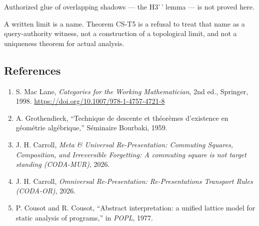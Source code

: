 \documentclass[
  11pt,
]{article}
\providecommand{\tightlist}{%
  \setlength{\itemsep}{0pt}\setlength{\parskip}{0pt}}
\begin{document}
Authorized glue of overlapping shadows --- the H3'\,' lemma --- is not proved here.

A written limit is a name. Theorem CS-T5 is a refusal to treat that name as a query-authority witness, not a construction of a topological limit, and not a uniqueness theorem for actual analysis.

\subsection{References}\label{references}

\begin{enumerate}
\def\labelenumi{\arabic{enumi}.}
\tightlist
\item
  S. Mac Lane, \emph{Categories for the Working Mathematician}, 2nd ed., Springer, 1998. \url{https://doi.org/10.1007/978-1-4757-4721-8}
\item
  A. Grothendieck, ``Technique de descente et théorèmes d'existence en géométrie algébrique,'' Séminaire Bourbaki, 1959.
\item
  J. H. Carroll, \emph{Meta \& Universal Re-Presentation: Commuting Squares, Composition, and Irreversible Forgetting: A commuting square is not target standing (CODA-MUR)}, 2026.
\item
  J. H. Carroll, \emph{Omniversal Re-Presentation: Re-Presentations Transport Rules (CODA-OR)}, 2026.
\item
  P. Cousot and R. Cousot, ``Abstract interpretation: a unified lattice model for static analysis of programs,'' in \emph{POPL}, 1977.
\end{enumerate}
\end{document}
